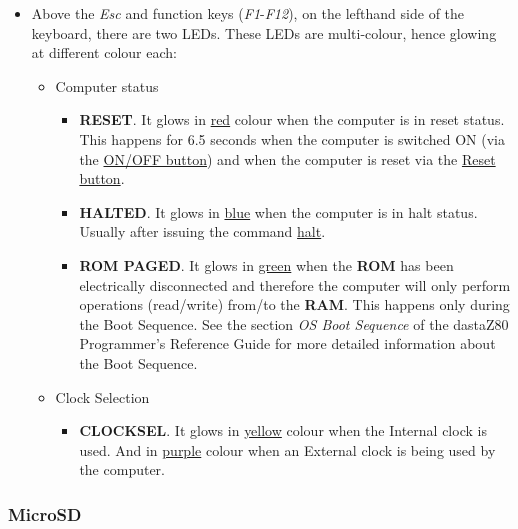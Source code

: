     \begin{itemize}
        \item Above the \textit{Esc} and function keys (\textit{F1}-\textit{F12}),
        on the lefthand side of the keyboard, there are two LEDs. These LEDs are
        multi-colour, hence glowing at different colour each:
        \begin{itemize}
            \item Computer status
            \begin{itemize}
                \item \textbf{RESET}. It glows in \underline{red} colour when
                the computer is in reset status. This happens for 6.5 seconds
                when the computer is switched ON (via the
                \hyperref[subsec:onoffbutt]{ON/OFF button}) and when the
                computer is reset via the \hyperref[subsec:resetbutton]
                {Reset button}.
                \item \textbf{HALTED}. It glows in \underline{blue} when the
                computer is in halt status. Usually after issuing the command
                \hyperref[cmd:halt]{halt}.
                \item \textbf{ROM PAGED}. It glows in \underline{green} when the
                \textbf{ROM} has been electrically disconnected and therefore
                the computer will only perform operations (read/write) from/to
                the \textbf{RAM}. This happens only during the Boot Sequence.
                See the section \textit{OS Boot Sequence} of the dastaZ80
                Programmer's Reference Guide\cite{dastaz80progref} for more
                detailed information about the Boot Sequence.
            \end{itemize}
            \item Clock Selection
            \begin{itemize}
                \item \textbf{CLOCKSEL}. It glows in \underline{yellow} colour
                when the Internal clock is used. And in \underline{purple}
                colour when an External clock is being used by the computer.
            \end{itemize}
        \end{itemize}
    \end{itemize}

    \subsubsection{MicroSD}

